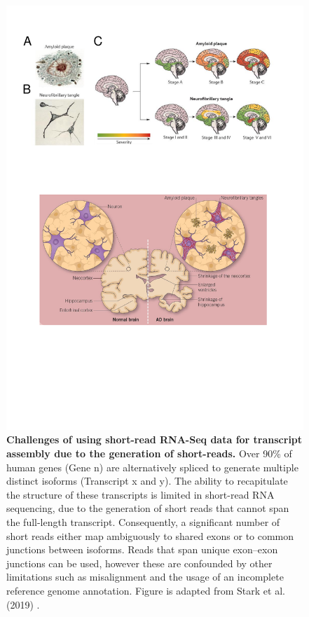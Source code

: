 \begin{landscape}
	\begin{figure}[htp]
		\centering
		\includegraphics[page=10,trim={0 19cm 2cm 1cm},clip, scale = 1]{Figures/Introduction_Figures.pdf}
		\captionsetup{width=1.2\textwidth}
		\caption[Challenges of using short-read RNA-Seq data for transcriptome profiling studies]%
		{\textbf{Challenges of using short-read RNA-Seq data for transcript assembly due to the generation of short-reads.} Over 90\% of human genes (Gene n) are alternatively spliced to generate multiple distinct isoforms (Transcript x and y). The ability to recapitulate the structure of these transcripts is limited in short-read RNA sequencing, due to the generation of short reads that cannot span the full-length transcript. Consequently, a significant number of short reads either map ambiguously to shared exons or to common junctions between isoforms. Reads that span unique exon–exon junctions can be used, however these are confounded by other limitations such as misalignment and the usage of an incomplete reference genome annotation. Figure is adapted from Stark et al. (2019) \cite{Stark2019}.}
		\label{fig:rna_seq_limitations}
	\end{figure}
\end{landscape}


